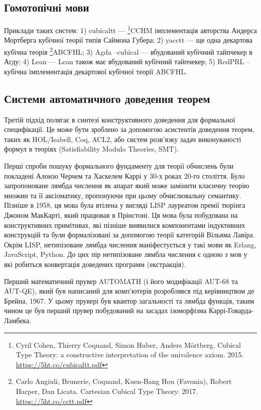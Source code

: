 \subsection{Гомотопічні мови}
Приклади таких систем:
1) cubicaltt --- \footnote{Cyril Cohen, Thierry Coquand, Simon Huber, Anders M{\"{o}}rtberg. Cubical Type Theory: a constructive interpretation of the univalence axiom. 2015. \url{https://5ht.co/cubicaltt.pdf}}{CCHM} імплементація авторства Андерса Мортберга кубічної теорії типів Саймона Губера;
2) yacctt --- ще одна декартова кубічна теорія \footnote{Carlo Angiuli, Brunerie, Coquand, Kuen-Bang Hou (Favonia), Robert Harper, Dan Licata. Cartesian Cubical Type Theory. 2017. \url{https://5ht.co/cctt.pdf}}{ABCFHL};
3) Agda --cubical --- вбудований кубічний тайпчекер в Агду;
4) Lean --- Lean також має вбудований кубічний тайпчекер;
5) RedPRL -- кубічна імплементація декартової кубічної теорії ABCFHL.

\subsection{Системи автоматичного доведення теорем}
Третій підхід полягає в синтезі конструктивного доведення
для формальної специфікації. Це може бути зроблено за
допомогою асистентів доведення теорем, таких як HOL/Isabell, Coq, ACL2,
або систем розв'язку задач виконуваності формул в теоріях (Satisfiability
Modulo Theories, SMT).

Перші спроби пошуку формального фундаменту для теорії обчислень були покладені
Алонзо Черчем та Хаскелем Каррі у 30-х роках 20-го століття. Було запропоноване
лямбда числення як апарат який може замінити класичну теорію множин та її аксіоматику,
пропонуючи при цьому обчислювальну семантику. Пізніше в 1958, ця мова була втілена
у вигляді LISP лауреатом премії тюрінга Джоном МакКарті, який працював в Прінстоні.
Ця мова була побудована на конструктивних примітивах, які пізніше виявилися компонентами
індуктивних конструкцій та були формалізовані за допомогою
теорії категорій Вільяма Лавіра. Окрім LISP, нетипізоване лямбда числення
маніфестується у такі мови як Erlang, JavaScript, Python.
До цих пір нетипізоване лямбла числення є одною з мов у які робиться
конвертація доведених программ (екстракція).

Перший математичний прувер AUTOMATH (і його модифікації AUT-68 та AUT-QE),
який був написаний для комп'ютерів розроблявся під керівництвом де Брейна, 1967.
У цьому прувері був квантор загальності та лямбда функція, таким чином це був перший прувер
побудований на засадах ізоморфізма Каррі-Говарда-Ламбека.

